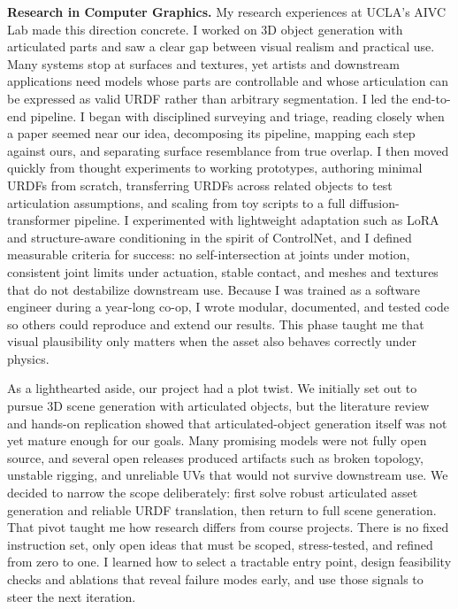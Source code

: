 \documentclass[11pt]{article}
\begin{document}
\textbf{Research in Computer Graphics.}
My research experiences at UCLA's AIVC Lab made this direction concrete. I
worked on 3D object generation with articulated parts and saw a
clear gap between visual realism and practical use. Many systems stop at
surfaces and textures, yet artists and downstream applications need models whose
parts are controllable and whose articulation can be expressed as valid URDF
rather than arbitrary segmentation. I led the end-to-end pipeline. I began with
disciplined surveying and triage, reading closely when a paper seemed near our
idea, decomposing its pipeline, mapping each step against ours, and separating
surface resemblance from true overlap. I then moved quickly from thought
experiments to working prototypes, authoring minimal URDFs from scratch,
transferring URDFs across related objects to test articulation assumptions, and
scaling from toy scripts to a full diffusion-transformer pipeline. I
experimented with lightweight adaptation such as LoRA and structure-aware
conditioning in the spirit of ControlNet, and I defined measurable criteria for
success: no self-intersection at joints under motion, consistent joint limits
under actuation, stable contact, and meshes and textures that do not destabilize
downstream use. Because I was trained as a software engineer during a year-long
co-op, I wrote modular, documented, and tested code so others could reproduce
and extend our results. This phase taught me that visual plausibility only
matters when the asset also behaves correctly under physics.

As a lighthearted aside, our project had a plot twist.
We initially set out to pursue 3D scene generation with articulated objects, but
the literature review and hands-on replication showed that articulated-object
generation itself was not yet mature enough for our goals. Many promising models
were not fully open source, and several open releases produced artifacts such as
broken topology, unstable rigging, and unreliable UVs that would not survive
downstream use. We decided to narrow the scope deliberately: first solve robust
articulated asset generation and reliable URDF translation, then return to full
scene generation. That pivot taught me how research differs from course projects.
There is no fixed instruction set, only open ideas that must be scoped,
stress-tested, and refined from zero to one. I learned how to select a tractable
entry point, design feasibility checks and ablations that reveal failure modes
early, and use those signals to steer the next iteration.
\end{document}
